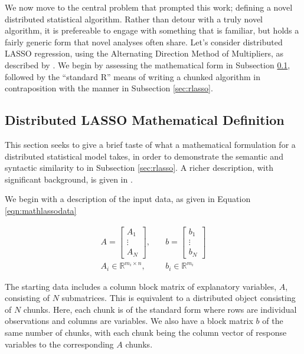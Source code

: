 We now move to the central problem that prompted this work; defining a novel distributed statistical algorithm.
Rather than detour with a truly novel algorithm, it is prefereable to engage with something that is familiar, but holds a fairly generic form that novel analyses often share.
Let's consider distributed LASSO regression, using the Alternating Direction Method of Multipliers, as described by \textcite{mateos2010}.
We begin by assessing the mathematical form in Subsection \cref{sec:mathlasso}, followed by the ``standard R'' means of writing a chunked algorithm in contraposition with the  manner in Subsection \cref{sec:rlasso}.

\subsection{Distributed LASSO Mathematical Definition}\label{sec:mathlasso}

This section seeks to give a brief taste of what a mathematical formulation for a distributed statistical model takes, in order to demonstrate the semantic and syntactic similarity to  in Subsection \cref{sec:rlasso}.
A richer description, with significant background, is given in \textcite{boyd2011}.

We begin with a description of the input data, as given in Equation \cref{eqn:mathlassodata}

\begin{equation}
\begin{aligned}\label{eqn:mathlassodata}
    A = \begin{bmatrix}
        A_1\\
        \vdots \\
        A_N
    \end{bmatrix},&
    \quad b=\begin{bmatrix}
        b_1\\
        \vdots \\
        b_N
    \end{bmatrix}\\
    A_i \in \mathbb{R}^{m_i\times n},& \quad b_i \in \mathbb{R}^{m_i}
\end{aligned}
\end{equation}

The starting data includes a column block matrix of explanatory variables, $A$, consisting of $N$ submatrices.
This is equivalent to a distributed object consisting of $N$ chunks.
Here, each chunk is of the standard form where rows are individual observations and columns are variables.
We also have a block matrix $b$ of the same number of chunks, with each chunk being the column vector of response variables to the corresponding $A$ chunks.

